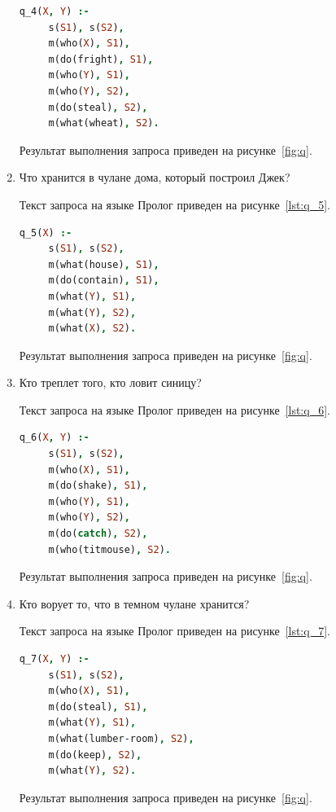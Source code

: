 \begin{enumerate}
  \begin{lstlisting}[style=source_code,language=prolog,
    caption=Текст запроса,label=lst:q_4]
 q_4(X, Y) :-
     s(S1), s(S2),
     m(who(X), S1),
     m(do(fright), S1),
     m(who(Y), S1),
     m(who(Y), S2),
     m(do(steal), S2),
     m(what(wheat), S2).
  \end{lstlisting}

  Результат выполнения запроса приведен на рисунке~\ref{fig:q}.

\newpage

\item Что хранится в чулане дома, который построил Джек?

  Текст запроса на языке Пролог приведен на рисунке~\ref{lst:q_5}.

  \begin{lstlisting}[style=source_code,language=prolog,
    caption=Текст запроса,label=lst:q_5]
 q_5(X) :-
     s(S1), s(S2),
     m(what(house), S1),
     m(do(contain), S1),
     m(what(Y), S1),
     m(what(Y), S2),
     m(what(X), S2).
  \end{lstlisting}

  Результат выполнения запроса приведен на рисунке~\ref{fig:q}.

\item Кто треплет того, кто ловит синицу?

  Текст запроса на языке Пролог приведен на рисунке~\ref{lst:q_6}.

  \begin{lstlisting}[style=source_code,language=prolog,
    caption=Текст запроса,label=lst:q_6]
 q_6(X, Y) :-
     s(S1), s(S2),
     m(who(X), S1),
     m(do(shake), S1),
     m(who(Y), S1),
     m(who(Y), S2),
     m(do(catch), S2),
     m(who(titmouse), S2).
  \end{lstlisting}

  Результат выполнения запроса приведен на рисунке~\ref{fig:q}.

\newpage

\item Кто ворует то, что в темном чулане хранится?

  Текст запроса на языке Пролог приведен на рисунке~\ref{lst:q_7}.

  \begin{lstlisting}[style=source_code,language=prolog,
    caption=Текст запроса,label=lst:q_7]
 q_7(X, Y) :-
     s(S1), s(S2),
     m(who(X), S1),
     m(do(steal), S1),
     m(what(Y), S1),
     m(what(lumber-room), S2),
     m(do(keep), S2),
     m(what(Y), S2).
  \end{lstlisting}

  Результат выполнения запроса приведен на рисунке~\ref{fig:q}.

\end{enumerate}

